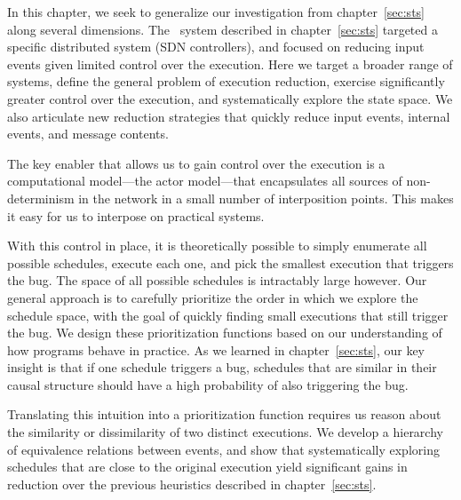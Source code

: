
In this chapter, we seek to generalize our investigation from
chapter~\ref{sec:sts} along several dimensions.
The \projectname~system described in chapter~\ref{sec:sts} targeted a specific distributed system (SDN controllers), and focused
on reducing input events given limited control over the execution.
Here we target a broader range of systems, define the
general problem of execution reduction, exercise significantly greater
control over the execution, and systematically explore the state space. We also articulate new
reduction
strategies that quickly reduce input events,
internal events, and message contents.

The key enabler that allows us to gain control over the execution is a
computational model---the actor model---that encapsulates all sources of
non-determinism in the network in a small number of interposition points.
This makes it easy for us to interpose on practical systems.

With this control in place, it is theoretically possible to simply enumerate all possible schedules, execute each one, and pick the smallest execution that triggers the bug.
The space of all possible schedules is intractably large however.
Our general approach is to carefully prioritize the order in which we explore
the schedule space, with the goal of quickly finding small executions that
still trigger the bug. We design these prioritization functions based on our
understanding of how programs behave in practice. As we learned in
chapter~\ref{sec:sts}, our key insight is that if one schedule triggers a bug, schedules that are similar in their causal structure should have a high probability of also triggering the bug.

Translating this intuition into a prioritization function requires us reason
about the similarity or dissimilarity of two distinct executions.
We develop a hierarchy of equivalence relations between events, and show
that systematically exploring schedules that are close to the original
execution yield significant gains in reduction over the previous
heuristics described in chapter~\ref{sec:sts}.




